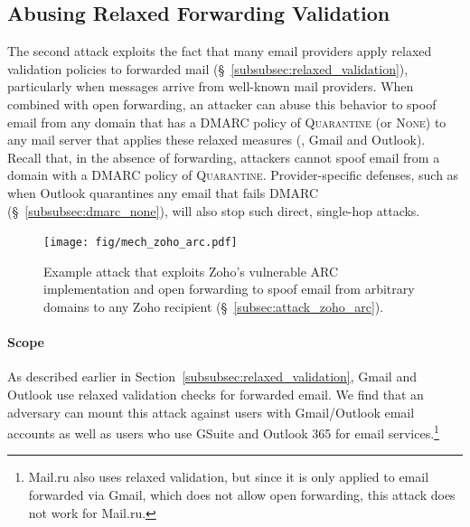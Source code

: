 \subsection{Abusing Relaxed Forwarding Validation}
\label{subsec:attack_relaxed_forwarding_validation}

The second attack exploits the fact that many email providers apply relaxed validation policies to forwarded mail (\S~\ref{subsubsec:relaxed_validation}), particularly when messages arrive from well-known mail providers.
When combined with open forwarding, an attacker can abuse this behavior
to spoof email from any domain that has a DMARC policy of
\textsc{Quarantine} (or \textsc{None}) to any mail server that applies these relaxed measures (\eg, Gmail and Outlook).  Recall that, in the absence of forwarding, attackers cannot spoof email from a domain with a DMARC policy of \textsc{Quarantine}.
Provider-specific defenses, such as when Outlook quarantines any email that fails DMARC (\S~\ref{subsubsec:dmarc_none}), will also stop such direct, single-hop attacks.

\begin{figure}[t]
\centerline{\texttt{[image: fig/mech\_zoho\_arc.pdf]}}
\centering
\caption[Example Attack Exploiting Zoho's Vulnerable ARC Implementation]{Example attack that exploits Zoho's
vulnerable ARC implementation and  open forwarding to
  spoof email from arbitrary domains to any Zoho recipient (\S~\ref{subsec:attack_zoho_arc}).}
\label{fig:mech_zoho_arc}
\end{figure}

\paragraph{Scope}
As described earlier in Section~\ref{subsubsec:relaxed_validation}, Gmail and Outlook use relaxed validation checks for forwarded email.
We find that an adversary can mount this attack against users with
Gmail/Outlook email accounts as well as users who use GSuite and Outlook 365 for email services.\footnote{Mail.ru also uses relaxed validation, but since it is only applied to email forwarded via Gmail, which does not allow open forwarding, this attack does not work for Mail.ru.}

